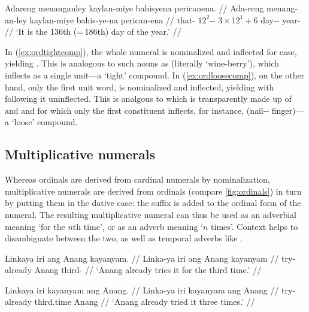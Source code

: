 \a\label{ex:ordloosecomp}\begingl
	\gla Adareng menanganley kaylan-miye bahisyena pericanena. //
	\glb Ada-reng menang-an-ley kaylan-miye bahis-ye-na perican-ena //
	\glc that-\AargI{} {$12^2$-\Nmlz{}-\PargI{}} {$3 \times 12^1 
		+ 6$} day-\Pl{}-\Gen{} year-\Gen{} //
	\glft `It is the 136th (=\,186th) day of the year.' //
\endgl

\xe

In (\ref{ex:ordtightcomp}), the whole numeral  is
nominalized and inflected for case, yielding
. This is analogous to such nouns as
 (literally `wine-berry'), which inflects
as a single unit---a `tight' compound. In (\ref{ex:ordloosecomp}), on the other
hand, only the first unit word,  is nominalized and
inflected, yielding  with
 following it uninflected. This is analgous to
 which is transparently made up of
 and  and for which only the
first constituent inflects, for instance,  (nail-\Pl{}-\Gen{} finger)---a `loose' compound.


\subsection{Multiplicative numerals}

Whereas ordinals are derived from cardinal numerals by nominalization,
multiplicative numerals are derived from ordinals (compare
\autoref{fig:ordinals}) in turn by putting them in the dative case: the suffix
 is added to the ordinal form of the numeral. The resulting
multiplicative numeral can thus be used as an adverbial meaning `for the $n$th
time', or as an adverb meaning `$n$ times'. Context helps to disambiguate
between the two, as well as temporal adverbs like .

\pex
\a\begingl
	\gla Linkaya iri ang Anang kayanyam. //
	\glb Linka-ya iri ang Anang kayanyam //
	\glc try-\TsgM{} already \Aarg{} Anang third-\Dat{} //
	\glft `Anang already tries it for the third time.' //
\endgl

\a\begingl
	\gla Linkaya iri kayanyam ang Anang. //
	\glb Linka-ya iri kayanyam ang Anang //
	\glc try-\TsgM{} already third.time \Aarg{} Anang //
	\glft `Anang already tried it three times.' //
\endgl

